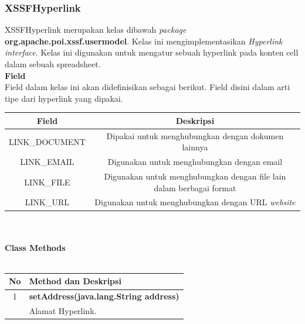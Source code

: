 \subsubsection{XSSFHyperlink}
XSSFHyperlink merupakan kelas dibawah \textit{package} \textbf{org.apache.poi.xssf.usermodel}. Kelas ini mengimplementasikan \textit{Hyperlink interface}. Kelas ini digunakan untuk mengatur sebuah hyperlink pada konten cell dalam sebuah spreadsheet.\cite{tutpoint}
\\
\noindent \textbf{Field}\\
Field dalam kelas ini akan didefinisikan sebagai berikut. Field disini dalam arti tipe dari hyperlink yang dipakai.\\
\begin{tabular}{|c|c|}
		\hline
		\textbf{Field} & \textbf{Deskripsi} \\ \hline \hline
		LINK\_DOCUMENT & Dipakai untuk menghubungkan dengan dokumen lainnya\\ \hline 
		LINK\_EMAIL &	Digunakan untuk menghubungkan dengan email\\ \hline 
		LINK\_FILE & Digunakan untuk menghubungkan dengan file lain dalam berbagai format \\ \hline
		LINK\_URL	&	Digunakan untuk menghubungkan dengan URL \textit{website}\\ \hline
	\end{tabular}
	\\ \\
	\noindent \textbf{Class Methods}\\ \\
	\begin{tabular}{|c|p{12cm}|}
		\hline
		\textbf{No} & \textbf{Method dan Deskripsi} \\ \hline \hline
		1 & \textbf{setAddress(java.lang.String address)}\\
			&	Alamat Hyperlink.\\ \hline
	\end{tabular}

